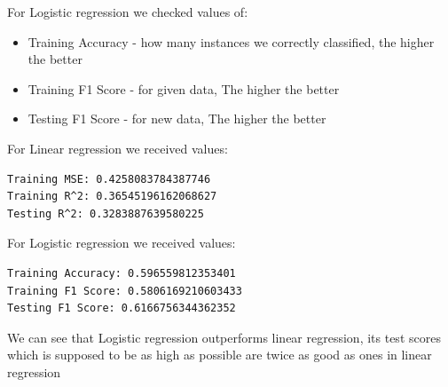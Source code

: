 \documentclass{article}[12pt]
\begin{document}
For Logistic regression we checked values of:
\begin{itemize}
    \item Training Accuracy - how many instances we correctly classified, the higher the better 
    \item Training F1 Score - for given data, The higher the better 
    \item Testing F1 Score - for new data, The higher the better
\end{itemize}

For Linear regression we received values:
\begin{lstlisting}[language=bash]
Training MSE: 0.4258083784387746
Training R^2: 0.36545196162068627
Testing R^2: 0.3283887639580225
\end{lstlisting}

For Logistic regression we received values:
\begin{lstlisting}[language=bash]
Training Accuracy: 0.596559812353401
Training F1 Score: 0.5806169210603433
Testing F1 Score: 0.6166756344362352
\end{lstlisting}
We can see that Logistic regression outperforms linear regression, its test scores which is supposed to be as high as possible are twice as good as ones in linear regression 
\end{document}
